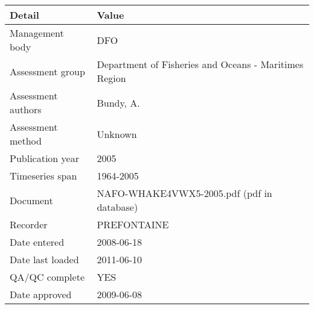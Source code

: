 \begin{table}[htb]
\centering
\begin{tabular}{lp{7cm}}
\toprule
Detail & Value \\
\midrule
Management body    & DFO                                                   \\
Assessment group   & Department of Fisheries and Oceans - Maritimes Region \\
Assessment authors & Bundy, A.                                             \\
Assessment method  & Unknown                                               \\
Publication year   & 2005                                                  \\
Timeseries span    & 1964-2005                                             \\
Document           & NAFO-WHAKE4VWX5-2005.pdf (pdf in database)            \\
Recorder           & PREFONTAINE                                           \\
Date entered       & 2008-06-18                                            \\
Date last loaded   & 2011-06-10                                            \\
QA/QC complete     & YES                                                   \\
Date approved      & 2009-06-08                                            \\
\bottomrule
\end{tabular}
\label{tab:assessdet}
\end{table}
